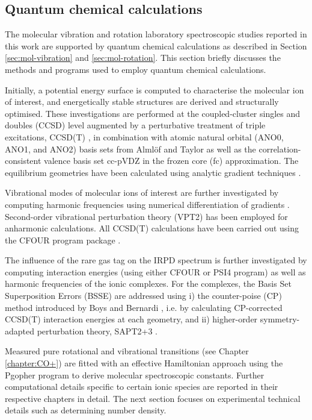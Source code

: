 \subsection{Quantum chemical calculations}
\label{sec:QC-calculations}
The molecular vibration and rotation laboratory spectroscopic studies reported in this work are supported by quantum chemical calculations as described in Section \ref{sec:mol-vibration} and \ref{sec:mol-rotation}. This section briefly discusses the methods and programs used to employ quantum chemical calculations.

Initially, a potential energy surface is computed to characterise the molecular ion of interest, and energetically stable structures are derived and structurally optimised. These investigations are performed at the coupled-cluster singles and doubles (CCSD) level augmented by a perturbative treatment of triple excitations, CCSD(T) \cite{raghavachari_fifth-order_1989}, in combination with atomic natural orbital (ANO0, ANO1, and ANO2) basis sets from Alml\"of and Taylor \cite{almlof_general_1987, almlof_atomic_1991} as well as the correlation-consistent valence basis set cc-pVDZ \cite{dunning_gaussian_1989} in the frozen core (fc) approximation. The equilibrium geometries have been calculated using analytic gradient techniques  \cite{watts_open-shell_1992}.

Vibrational modes of molecular ions of interest are further investigated by computing harmonic frequencies using numerical differentiation of gradients \cite{lee_analytic_1991, watts_coupledcluster_1993}. Second-order vibrational perturbation theory (VPT2) \cite{mills_32_1972} has been employed for anharmonic calculations. All CCSD(T) calculations have been carried out using the CFOUR program package  \cite{matthews_coupled-cluster_2020,harding_parallel_2008}.

The influence of the rare gas tag on the IRPD spectrum is further investigated by computing interaction energies (using either CFOUR \cite{matthews_coupled-cluster_2020} or PSI4 \cite{smith_psi4_2020} program) as well as harmonic frequencies of the ionic complexes. For the complexes, the Basis Set Superposition Errors (BSSE) \cite{liu_accurate_1973} are addressed using i) the counter-poise (CP) method introduced by Boys and Bernardi \cite{boys_calculation_1970}, i.e. by calculating CP-corrected CCSD(T) interaction energies at each geometry, and ii) higher-order symmetry-adapted perturbation theory, SAPT2+3 \cite{jeziorski_perturbation_1994, hohenstein_density_2010}. 

Measured pure rotational and vibrational transitions (see Chapter \ref{chapter:CO+}) are fitted with an effective Hamiltonian approach using the Pgopher program \cite{western_pgopher_2017} to derive molecular spectroscopic constants. Further computational details specific to certain ionic species are reported in their respective chapters in detail. The next section focuses on experimental technical details such as determining number density.
